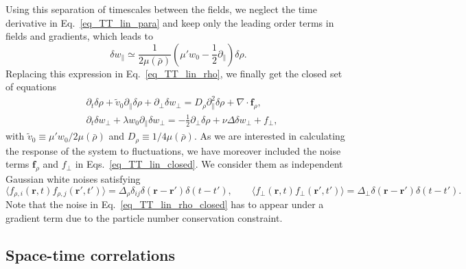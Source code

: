 Using this separation of timescales between the fields, 
we neglect the time derivative in Eq.~\eqref{eq_TT_lin_para} and keep only the leading order terms in fields and gradients, which leads to
\begin{equation*}
\delta w_\| \simeq \frac{1}{2\mu(\bar{\rho})}\left( \mu' w_0 - \frac{1}{2}\partial_\| \right) \delta \rho .
\end{equation*}
Replacing this expression in Eq.~\eqref{eq_TT_lin_rho}, we finally get the closed set of equations
\begin{subequations}
\label{eq_TT_lin_closed}
\begin{align}
\label{eq_TT_lin_rho_closed}
&\partial_t \delta \rho + \tilde{v}_0\partial_\| \delta \rho + \partial_\perp \delta w_\perp = D_\rho \partial_\|^2 \delta\rho + \nabla \cdot \bm f_\rho, \\
\label{eq_TT_lin_perp_closed}
&\partial_t \delta w_\perp + \lambda w_0  \partial_\| \delta w_\perp =  - \frac{1}{2}\partial_\perp \delta \rho + \nu \Delta \delta w_\perp + f_\perp,
\end{align}
\end{subequations}
with $\tilde{v}_0 \equiv \mu' w_0 /  2\mu(\bar{\rho})$ and $D_\rho \equiv 1/4\mu(\bar{\rho})$.
As we are interested in calculating the response of the system to fluctuations, 
we have moreover included the noise terms $\bm f_\rho$ and $f_\perp$ in Eqs.~\eqref{eq_TT_lin_closed}.
We consider them as independent Gaussian white noises satisfying
\begin{equation} \label{eq_varf}
\langle f_{\rho,i}(\bm r,t)  f_{\rho,j}(\bm r',t') \rangle = \Delta_\rho \delta_{ij}\delta(\bm r - \bm r')\delta(t - t') , \qquad
\langle f_\perp(\bm r,t)f_\perp(\bm r',t') \rangle = \Delta_\perp \delta(\bm r - \bm r')\delta(t - t') .
\end{equation}
Note that the noise in Eq.~\eqref{eq_TT_lin_rho_closed} has to appear under a gradient term due to the particle number conservation constraint.

\subsection{Space-time correlations}


